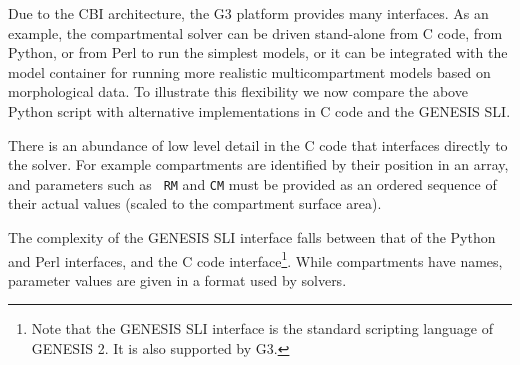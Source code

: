 \documentclass[12pt]{article}
\begin{document}
Due to the CBI architecture, the G3 platform provides many interfaces.
As an example, the compartmental solver can be driven stand-alone from
C code, from Python, or from Perl to run the simplest models, or it
can be integrated with the model container for running more realistic
multicompartment models based on morphological data.  To illustrate
this flexibility we now compare the above Python script with
alternative implementations in C code and the GENESIS SLI.

There is an abundance of low level detail in the C code that
interfaces directly to the solver.  For example compartments are
identified by their position in an array, and parameters such as {\tt
  RM} and {\tt CM} must be provided as an ordered sequence of their
actual values (scaled to the compartment surface area).

The complexity of the GENESIS SLI interface falls between that of the
Python and Perl interfaces, and the C code interface\footnote{Note
  that the GENESIS SLI interface is the standard scripting language of
  GENESIS 2. It is also supported by G3.}.  While compartments have
names, parameter values are given in a format used by solvers.
\end{document}
